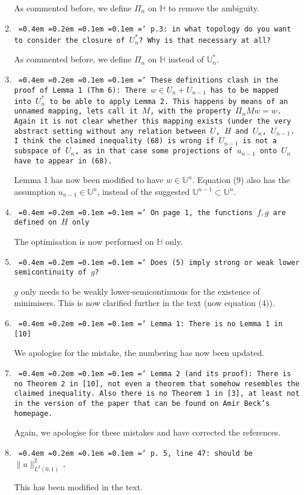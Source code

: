 \documentclass[12pt]{article}
\newcommand*\justify{%
	\fontdimen2\font=0.4em%
	\fontdimen3\font=0.2em%
	\fontdimen4\font=0.1em%
	\fontdimen7\font=0.1em%
	\hyphenchar\font=`\-%
}
\newcommand{\review}[1]{\texttt{\justify{#1}}}
\newcommand{\F}[1]{\mathbb{#1}}
\begin{document}
\begin{enumerate}
	As commented before, we define $\Pi_n$ on $\F H$ to remove the ambiguity.
	
	\item \review{p.3: in what topology do you want to consider the closure of $U_n^*$? Why is that necessary at all?}
	
	As commented before, we define $\Pi_n$ on $\F H$ instead of $\F U_n^*$.	
	
	\item \review{These definitions clash in the proof of Lemma 1 (Thm 6): There $w\in U_n+U_{n-1}$ has to be mapped into $U_n^*$ to be able to apply Lemma 2. This happens by means of an unnamed mapping, lets call it $M$, with the property $\Pi_nMw=w$. Again it is not clear whether this mapping exists (under the very abstract setting without any relation between $U$, $H$ and $U_n$, $U_{n-1}$. I think the claimed inequality (68) is wrong if $U_{n-1}$ is not a subspace of $U_n$, as in that case some projections of $u_{n-1}$ onto $U_n$ have to appear in (68).}
	
	Lemma 1 has now been modified to have $w\in \F U^n$. Equation (9) also has the assumption $u_{n-1}\in \F U^n$, instead of the suggested $\F U^{n-1}\subset \F U^n$.
	
	\item \review{On page 1, the functions $f,g$ are defined on $H$ only}
	
	The optimisation is now performed on $\F H$ only.
	
	\item \review{Does (5) imply strong or weak lower semicontinuity of $g$?}
	
	$g$ only needs to be weakly lower-semicontinuous for the existence of minimisers. This is now clarified further in the text (now equation (4)).
	
	\item \review{Lemma 1: There is no Lemma 1 in [10]}
	
	We apologise for the mistake, the numbering has now been updated.
	
	\item \review{Lemma 2 (and its proof): There is no Theorem 2 in [10], not even a theorem that somehow resembles the claimed inequality. Also there is no Theorem 1 in [3], at least not in the version of the paper that can be found on Amir Beck's homepage.}
	
	Again, we apologise for these mistakes and have corrected the references.
	
	\item \review{p. 5, line 47: should be $\lVert u\rVert_{L^2(0,1)}^2$.}
	
	This has been modified in the text.
\end{enumerate}
\end{document}
